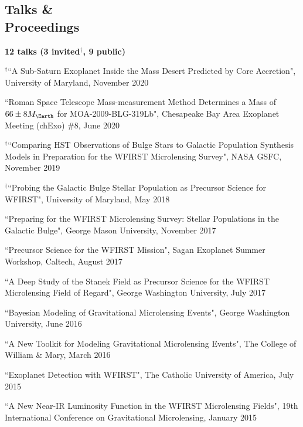 \documentclass[margin,line]{res}
\begin{document}
\begin{resume}
\section{\sc Talks \&\\ Proceedings}
\textbf{12 talks (3 invited$^{\dagger}$, 9 public)}\\
\begin{etaremune}
\item $^{\dagger}$``A Sub-Saturn Exoplanet Inside the Mass Desert Predicted by Core Accretion", University of Maryland, November 2020
\item ``Roman Space Telescope Mass-measurement Method Determines a Mass of $66 \pm 8M_{\Earth}$ for MOA-2009-BLG-319Lb", Chesapeake Bay Area Exoplanet Meeting (chExo) \#8, June 2020

\item $^{\dagger}$``Comparing HST Observations of Bulge Stars to Galactic Population Synthesis Models in Preparation for the WFIRST Microlensing Survey", NASA GSFC, November 2019 
\item $^{\dagger}$``Probing the Galactic Bulge Stellar Population as Precursor Science for WFIRST", University of Maryland, May 2018

\item ``Preparing for the WFIRST Microlensing Survey: Stellar Populations in the Galactic Bulge", George Mason University, November 2017

\item ``Precursor Science for the WFIRST Mission", Sagan Exoplanet Summer Workshop, Caltech, August 2017

\item ``A Deep Study of the Stanek Field as Precursor Science for the WFIRST Microlensing Field of Regard", George Washington University, July 2017

\item ``Bayesian Modeling of Gravitational Microlensing Events", George Washington University, June 2016

\item ``A New Toolkit for Modeling Gravitational Microlensing Events", The College of William \& Mary, March 2016

\item ``Exoplanet Detection with WFIRST", The Catholic University of America, July 2015

\item ``A New Near-IR Luminosity Function in the WFIRST Microlensing Fields", 19th International Conference on Gravitational Microlensing, January 2015


\end{etaremune}
\end{resume}
\end{document}

